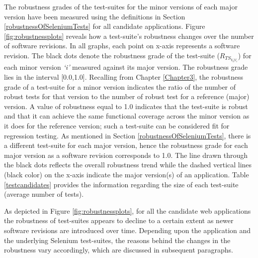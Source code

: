   
The robustness grades of the test-suites for the minor versions of each major version have been measured using the definitions in Section \ref{robustnessOfSeleniumTests} for all candidate applications. Figure \ref{fig:robustnessplots} reveals how a test-suite's robustness changes over the number of software revisions. In all graphs, each point on x-axis represents a software revision. The black dots denote the robustness grade of the test-suite ($R_{TS_{V_{0}V_{i}}}$) for each minor version \textit{`i'} measured against its major version. The robustness grade lies in the interval [0.0,1.0]. Recalling from Chapter \ref{Chapter3}, the robustness grade of a test-suite for a minor version indicates the ratio of the number of robust tests for that version to the number of robust test for a reference (major) version. A value of robustness equal to 1.0 indicates that the test-suite is robust and that it can achieve the same functional coverage across the minor version as it does for the reference version; such a test-suite can be considered fit for regression testing. As mentioned in Section \ref{robustnessOfSeleniumTests}, there is a different test-suite for each major version, hence the robustness grade for each major version as a software revision corresponds to 1.0. The line drawn through the black dots reflects the overall robustness trend while the dashed vertical lines (black color) on the x-axis indicate the major version(s) of an application. Table \ref{testcandidates} provides the information regarding the size of each test-suite (average number of tests).

As depicted in Figure \ref{fig:robustnessplots}, for all the candidate web applications the robustness of test-suites appears to decline to a certain extent as newer software revisions are introduced over time. Depending upon the application and the underlying Selenium test-suites, the reasons behind the changes in the robustness vary accordingly, which are discussed in subsequent paragraphs. 

